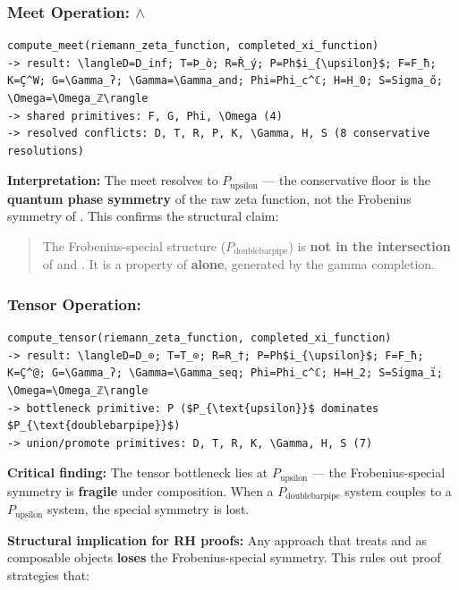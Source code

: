 \documentclass[12pt,a4paper]{article}
\begin{document}
\subsubsection{Meet Operation: \zeta $\land$ \xi}

\begin{lstlisting}
compute_meet(riemann_zeta_function, completed_xi_function)
-> result: \langleD=D_inf; T=Þ_ò; R=Ř_ý; P=Ph$i_{\upsilon}$; F=F_ħ; K=Ç^W; G=\Gamma_ʔ; \Gamma=\Gamma_and; Phi=Phi_c^ℂ; H=H_0; S=Sigma_ő; \Omega=\Omega_ℤ\rangle
-> shared primitives: F, G, Phi, \Omega (4)
-> resolved conflicts: D, T, R, P, K, \Gamma, H, S (8 conservative resolutions)
\end{lstlisting}

\textbf{Interpretation:} The meet resolves to $P_{\text{upsilon}}$ --- the conservative floor is the \textbf{quantum phase symmetry} of the raw zeta function, not the Frobenius symmetry of \xi. This confirms the structural claim:

\begin{quote}
The Frobenius-special structure ($P_{\text{doublebarpipe}}$) is \textbf{not in the intersection} of \zeta and \xi. It is a property of \xi \textbf{alone}, generated by the gamma completion.

\end{quote}

\subsubsection{Tensor Operation: \zeta \otimes \xi}

\begin{lstlisting}
compute_tensor(riemann_zeta_function, completed_xi_function)
-> result: \langleD=D_⊙; T=T_⊙; R=R_†; P=Ph$i_{\upsilon}$; F=F_ħ; K=Ç^@; G=\Gamma_ʔ; \Gamma=\Gamma_seq; Phi=Phi_c^ℂ; H=H_2; S=Sigma_ï; \Omega=\Omega_ℤ\rangle
-> bottleneck primitive: P ($P_{\text{upsilon}}$ dominates $P_{\text{doublebarpipe}}$)
-> union/promote primitives: D, T, R, K, \Gamma, H, S (7)
\end{lstlisting}

\textbf{Critical finding:} The tensor bottleneck lies at $P_{\text{upsilon}}$ --- the Frobenius-special symmetry is \textbf{fragile} under composition. When a $P_{\text{doublebarpipe}}$ system couples to a $P_{\text{upsilon}}$ system, the special symmetry is lost.

\textbf{Structural implication for RH proofs:} Any approach that treats \zeta and \xi as composable objects \textbf{loses} the Frobenius-special symmetry. This rules out proof strategies that:
\end{document}
